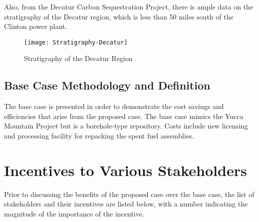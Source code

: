   
  \iffalse

\begin{figure}[!h] 
  \centering
  \texttt{[image: Crystalline-Thickness]}	
  \caption{Depth of Crystalline Rock
  \cite{Perry_2015}.}
  \label{fig:Depth}
\end{figure}

 \fi
  
  
  Also, from the Decatur Carbon Sequestration Project, there is ample data
  on the stratigraphy of the Decatur region, which is less than 50 miles south
  of the Clinton power plant.
 
  
  
  
\begin{figure}[!h] 
  \centering
  \texttt{[image: Stratigraphy-Decatur]}	
  \caption{Stratigraphy of the Decatur Region
  \cite{McDonald_2012}.}
  \label{fig:Stratigraphy}
\end{figure}
  
\subsection{Base Case Methodology and Definition}
The base case is presented in order to demonstrate the cost savings and efficiencies 
that arise from the proposed case. The base case mimics the Yucca Mountain Project
but is a borehole-type repository. Costs include new licensing and processing facility
 for repacking the spent fuel assemblies.


\section {Incentives to Various Stakeholders}

Prior to discussing the benefits of the proposed case over the base case, the list of
 stakeholders and their incentives are listed below, with a number indicating the 
 magnitude of the importance of the incentive.
 
 
\begin{table}[h]

\centering
\caption {Incentive Criterion and Weight for Each Stakeholder}
\end{table}

